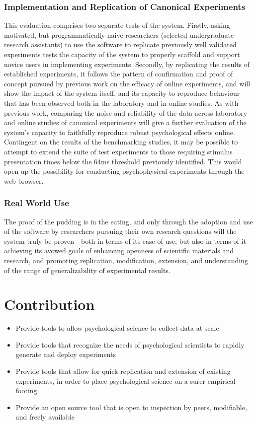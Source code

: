 \documentclass[12pt,a4paper,titlepage]{scrreprt}
\begin{document}
\subsection{Implementation and Replication of Canonical Experiments}
This evaluation comprises two separate tests of the system. Firstly, asking motivated, but programmatically naive researchers (selected undergraduate research assistants) to use the software to replicate previously well validated experiments tests the capacity of the system to properly scaffold and support novice users in implementing experiments.
Secondly, by replicating the results of established experiments, it follows the pattern of confirmation and proof of concept pursued by previous work on the efficacy of online experiments\cite{germine_is_2012,crump_evaluating_2013}, and will show the impact of the system itself, and its capacity to reproduce behaviour that has been observed  both in the laboratory and in online studies. As with previous work, comparing the noise and reliability of the data across laboratory and online studies of canonical experiments will give a further evaluation of the system's capacity to faithfully reproduce robust psychological effects online.
Contingent on the results of the benchmarking studies, it may be possible to attempt to extend the suite of test experiments to those requiring stimulus presentation times below the 64ms threshold previously identified\cite{crump_evaluating_2013}. This would open up the possibility for conducting psychophysical experiments through the web browser.
\subsection{Real World Use}
The proof of the pudding is in the eating, and only through the adoption and use of the software by researchers pursuing their own research questions will the system truly be proven - both in terms of its ease of use, but also in terms of it achieving its avowed goals of enhancing openness of scientific materials and research, and promoting replication, modification, extension, and understanding of the range of generalizability of experimental results.
\chapter{Contribution}
\begin{itemize}
\item Provide tools to allow psychological science to collect data at scale
\item Provide tools that recognize the needs of psychological scientists to rapidly generate and deploy experiments
\item Provide tools that allow for quick replication and extension of existing experiments, in order to place psychological science on a surer empirical footing
\item Provide an open source tool that is open to inspection by peers, modifiable, and freely available
\end{itemize}
      
    
    {}
\end{document}
